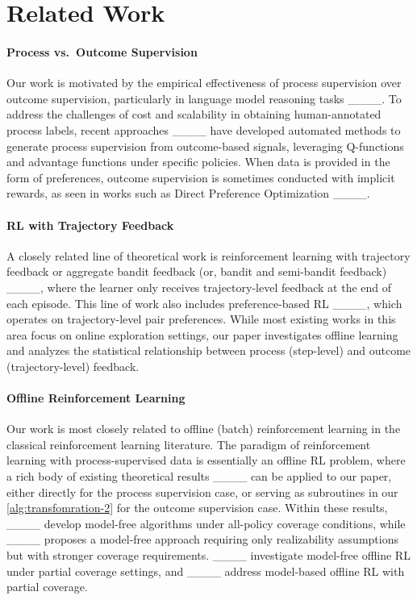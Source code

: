 \section{Related Work}
\label{sec: app-related-work}

\paragraph{Process vs.~Outcome Supervision}
Our work is motivated by the empirical effectiveness of process supervision over outcome supervision, particularly in language model reasoning tasks ____.
To address the challenges of cost and scalability in obtaining human-annotated process labels, recent approaches ____ have developed automated methods to generate process supervision from outcome-based signals, leveraging Q-functions and advantage functions under specific policies.
When data is provided in the form of preferences, outcome supervision is sometimes conducted with implicit rewards, as seen in works such as Direct Preference Optimization ____.


\paragraph{RL with Trajectory Feedback}
A closely related line of theoretical work is reinforcement learning with trajectory feedback or aggregate bandit feedback (or, bandit and semi-bandit feedback) ____, where the learner only receives trajectory-level feedback at the end of each episode. This line of work also includes preference-based RL ____, which operates on trajectory-level pair preferences. While most existing works in this area focus on online exploration settings, our paper investigates offline learning and analyzes the statistical relationship between process (step-level) and outcome (trajectory-level) feedback.


\paragraph{Offline Reinforcement Learning}
Our work is most closely related to offline (batch) reinforcement learning in the classical reinforcement learning literature.
The paradigm of reinforcement learning with process-supervised data is essentially an offline RL problem, where a rich body of existing theoretical results ____ can be applied to our paper, either directly for the process supervision case, or serving as subroutines in our \cref{alg:transfomration-2} for the outcome supervision case.
Within these results, ____ develop model-free algorithms under all-policy coverage conditions, while ____ proposes a model-free approach requiring only realizability assumptions but with stronger coverage requirements. ____ investigate model-free offline RL under partial coverage settings, and ____ address model-based offline RL with partial coverage.

